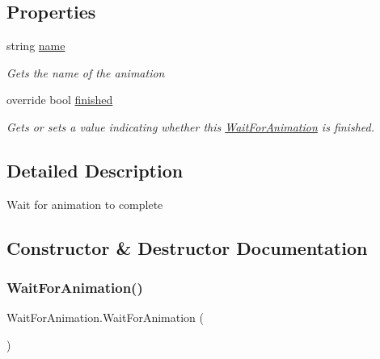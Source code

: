 \subsection*{Properties}
\begin{DoxyCompactItemize}
\item 
string \hyperlink{class_wait_for_animation_a2bd9db632988be8570fb739741d80222}{name}
\begin{DoxyCompactList}\small\item\em Gets the name of the animation \end{DoxyCompactList}\item 
override bool \hyperlink{class_wait_for_animation_a0d22165f584e254745d7d666de0c14e4}{finished}
\begin{DoxyCompactList}\small\item\em Gets or sets a value indicating whether this \hyperlink{class_wait_for_animation}{Wait\+For\+Animation} is finished. \end{DoxyCompactList}\end{DoxyCompactItemize}


\subsection{Detailed Description}
Wait for animation to complete 



\subsection{Constructor \& Destructor Documentation}
\mbox{\label{class_wait_for_animation_a448f51289c6580ed559bdd5955c38498}} 
\subsubsection{\texorpdfstring{Wait\+For\+Animation()}{WaitForAnimation()}\hspace{0.1cm}{\footnotesize\ttfamily [1/4]}}
{\footnotesize\ttfamily Wait\+For\+Animation.\+Wait\+For\+Animation (\begin{DoxyParamCaption}{ }\end{DoxyParamCaption})\hspace{0.3cm}{\ttfamily [inline]}}



